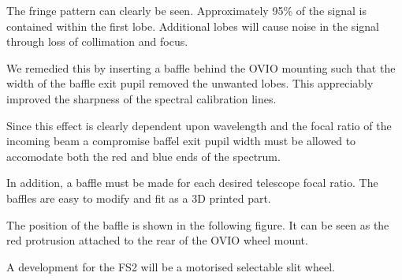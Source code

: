 \documentclass[letterpaper,10pt,english,openany,oneside]{sphinxmanual}
\begin{document}
\sphinxAtStartPar
The fringe pattern can clearly be seen. Approximately
95\% of the signal is contained within the first lobe.
Additional lobes will cause noise in the signal through
loss of collimation and focus.

\sphinxAtStartPar
We remedied this by inserting a baffle behind the OVIO
mounting such that the width of the baffle exit pupil
removed the unwanted lobes.  This appreciably improved
the sharpness of the spectral calibration lines.

\sphinxAtStartPar
Since this effect is clearly dependent upon wavelength
and the focal ratio of the incoming beam a compromise
baffel exit pupil width must be allowed to accomodate
both the red and blue ends of the spectrum.

\sphinxAtStartPar
In addition, a baffle must be made for each desired
telescope focal ratio.  The baffles are easy to modify
and fit as a 3D printed part.

\begin{figure}[htbp]
\centering

\noindent{}
\end{figure}

\sphinxAtStartPar
The position of the baffle is shown in the following
figure.  It can be seen as the red protrusion
attached to the rear of the OVIO wheel mount.

\begin{figure}[htbp]
\centering

\noindent{}
\end{figure}

\sphinxAtStartPar
A development for the FS2 will be a motorised selectable
slit wheel.
\end{document}
